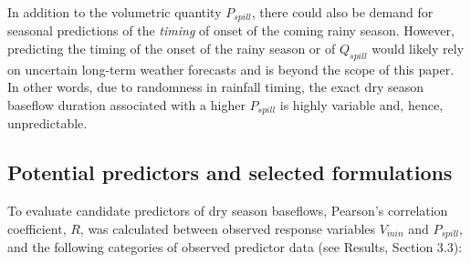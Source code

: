 \documentclass[hess, manuscript]{copernicus}
\begin{document}
In addition to the volumetric quantity \(P_{spill}\), there could also
be demand for seasonal predictions of the \emph{timing} of onset of the
coming rainy season. However, predicting the timing of the onset of the
rainy season or of \(Q_{spill}\) would likely rely on uncertain
long-term weather forecasts and is beyond the scope of this paper. In
other words, due to randomness in rainfall timing, the exact dry season
baseflow duration associated with a higher \(P_{spill}\) is highly
variable and, hence, unpredictable.

\subsection{Potential predictors and selected formulations}

To evaluate candidate predictors of dry season baseflows, Pearson's
correlation coefficient, \(R\), was calculated between observed response
variables \(V_{min}\) and \(P_{spill}\), and the following categories of
observed predictor data (see Results, Section 3.3):
\end{document}
